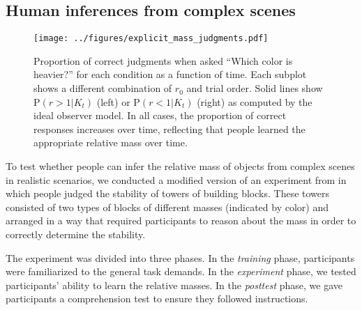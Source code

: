 \documentclass[10pt,letterpaper]{article}
\renewcommand{\Pr}[0]{\mathrm{P}}
\newcommand{\rlow}[0]{$r_0=0.1$}
\newcommand{\rhigh}[0]{$r_0=10$}
\newcommand{\vfb}[0]{video feedback}
\newcommand{\fb}[0]{binary text feedback}
\begin{document}
\subsection{Human inferences from complex scenes}

\begin{figure*}[t]
  \begin{center}
    \texttt{[image: ../figures/explicit\_mass\_judgments.pdf]}
    \caption{\small Proportion of correct judgments when asked ``Which
      color is heavier?'' for each condition as a function of
      time. Each subplot shows a different combination of $r_0$ and
      trial order. Solid lines show $\Pr(r>1|K_t)$ (left) or
      $\Pr(r<1|K_t)$ (right) as computed by the ideal observer
      model. In all cases, the proportion of correct responses
      increases over time, reflecting that people learned the
      appropriate relative mass over time.  }
    \label{fig:explicit-mass-judgments}
  \end{center}
\end{figure*}

To test whether people can infer the relative mass of objects from
complex scenes in realistic scenarios, we conducted a modified version
of an experiment from  in which people judged the
stability of towers of building blocks. These towers consisted of two
types of blocks of different masses (indicated by color) and arranged
in a way that required participants to reason about the mass in order
to correctly determine the stability.

The experiment was divided into three phases. In the \textit{training}
phase, participants were familiarized to the general task demands. In
the \textit{experiment} phase, we tested participants' ability to
learn the relative masses. In the \textit{posttest} phase, we gave
participants a comprehension test to ensure they followed
instructions.

\end{document}
